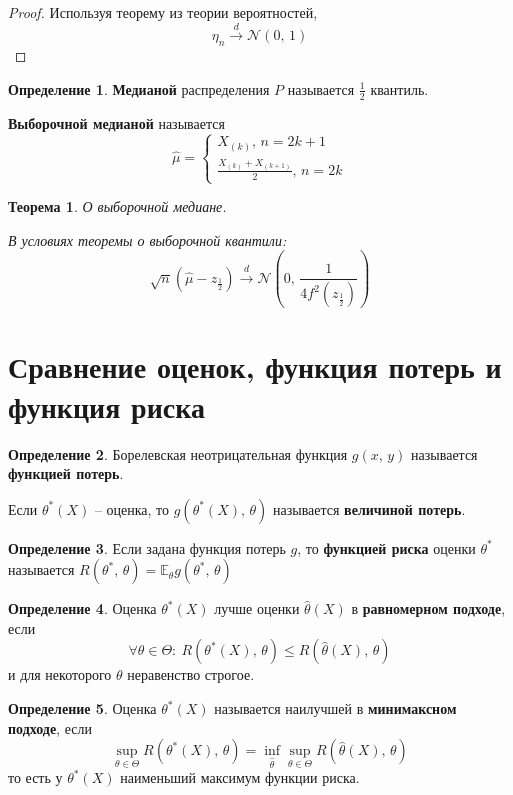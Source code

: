 \documentclass[a4paper,12pt]{article}
\renewcommand{\leq}{\ensuremath{\leqslant}}
\theoremstyle{plain}
\newtheorem{theorem}{Теорема}[section]
\theoremstyle{definition}
\newtheorem{definition}{Определение}[section]
\theoremstyle{remark}
\begin{document}
\begin{proof}
  Используя теорему из теории вероятностей,
  \[
    \eta_n \overset{d}{\to} \mathcal{N}(0,\, 1)
  \]
\end{proof}

\begin{definition}
  \textbf{Медианой} распределения $P$ называется $\frac{1}{2}$ квантиль.

  \textbf{Выборочной медианой} называется
  \[
    \hat{\mu} = \begin{cases}
      X_{(k)},\, n = 2k + 1\\
      \frac{X_{(k)} + X_{(k + 1)}}{2},\, n = 2k
    \end{cases}
  \]
\end{definition}

\begin{theorem}
  О выборочной медиане.

  В условиях теоремы о выборочной квантили:
  \[
    \sqrt{n}(\hat{\mu} - z_{\frac{1}{2}}) \overset{d}{\to} \mathcal{N}\left(0,\, \frac{1}{4f^2(z_{\frac{1}{2}})}\right)
  \]
\end{theorem}

\section{Сравнение оценок, функция потерь и функция риска}
\begin{definition}
  Борелевская неотрицательная функция $g(x,\,y)$ называется \textbf{функцией потерь}.

  Если $\theta^*(X)$ -- оценка, то $g(\theta^*(X),\, \theta)$ называется \textbf{величиной потерь}.
\end{definition}

\begin{definition}
  Если задана функция потерь $g$, то \textbf{функцией риска} оценки $\theta^*$ называется $R(\theta^*,\, \theta) = \mathbb{E}_\theta g(\theta^*,\, \theta)$
\end{definition}

\begin{definition}
  Оценка $\theta^*(X)$ лучше оценки $\hat{\theta}(X)$ в \textbf{равномерном подходе}, если 
  \[
    \forall \theta \in \Theta :\: R(\theta^*(X),\, \theta) \leq R(\hat{\theta}(X),\, \theta)
  \]
  и для некоторого $\theta$ неравенство строгое.
\end{definition}

\begin{definition}
  Оценка $\theta^*(X)$ называется наилучшей в \textbf{минимаксном подходе}, если 
  \[
    \sup_{\theta \in \Theta}R(\theta^*(X),\, \theta) = \inf_{\hat{\theta}}\sup_{\theta \in \Theta}R(\hat{\theta}(X),\, \theta)
  \]
  то есть у $\theta^*(X)$ наименьший максимум функции риска.
\end{definition}
\end{document}
